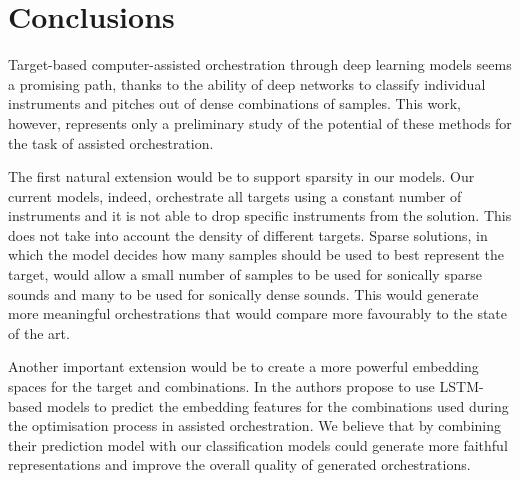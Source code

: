\documentclass[runningheads,a4paper]{llncs}
\begin{document}
\section{Conclusions}
\label{sec:conclusions}

Target-based computer-assisted orchestration through deep learning models seems a promising path, thanks to the ability of deep networks to classify individual instruments and pitches out of dense combinations of samples. This work, however, represents only a preliminary study of the potential of these methods for the task of assisted orchestration. 

The first natural extension would be to support sparsity in our models. Our current models, indeed, orchestrate all targets using a constant number of instruments and it is not able to drop specific instruments from the solution. This does not take into account the density of different targets. Sparse solutions, in which the model decides how many samples should be used to best represent the target, would allow a small number of samples to be used for sonically sparse sounds and many to be used for sonically dense sounds. This would generate more meaningful orchestrations that would compare more favourably to the state of the art.

Another important extension would be to create a more powerful embedding spaces for the target and combinations. In \cite{Gillick19} the authors propose to use LSTM-based models to predict the embedding features for the combinations used during the optimisation process in assisted orchestration. We believe that by combining their prediction model with our classification models could generate more faithful representations and improve the overall quality of generated orchestrations.
\end{document}
